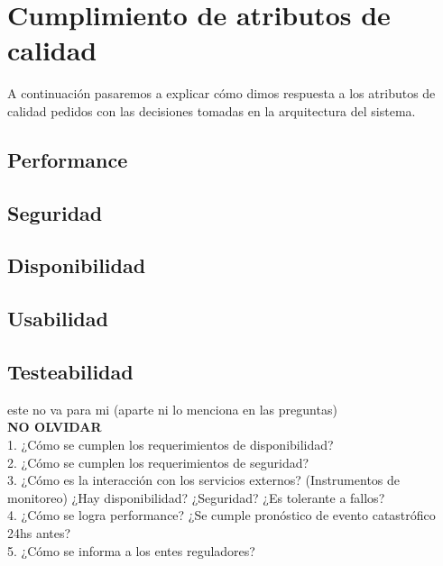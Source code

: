 \section{Cumplimiento de atributos de calidad}

\par A continuación pasaremos a explicar cómo dimos respuesta a los atributos de calidad pedidos con las decisiones tomadas en la arquitectura del sistema.

\subsection{Performance}

\par

\subsection{Seguridad}

\par

\subsection{Disponibilidad}

\par

\subsection{Usabilidad}

\par

\subsection{Testeabilidad}

este no va para mi (aparte ni lo menciona en las preguntas)\\



\textbf{NO OLVIDAR}\\
1. ¿Cómo se cumplen los requerimientos de disponibilidad?\\
2. ¿Cómo se cumplen los requerimientos de seguridad?\\
3. ¿Cómo es la interacción con los servicios externos? (Instrumentos de monitoreo) ¿Hay
disponibilidad? ¿Seguridad? ¿Es tolerante a fallos?\\
4. ¿Cómo se logra performance? ¿Se cumple pronóstico de evento catastrófico 24hs
antes?\\
5. ¿Cómo se informa a los entes reguladores?
